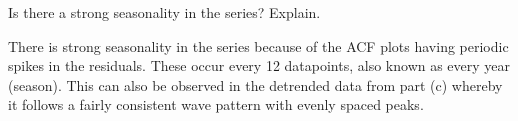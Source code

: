 Is there a strong seasonality in the series? Explain.

\nl There is strong seasonality in the series because of the ACF plots having periodic spikes in the residuals. These occur every 12 datapoints, also known as every year (season). This can also be observed in the detrended data from part (c) whereby it follows a fairly consistent wave pattern with evenly spaced peaks.
